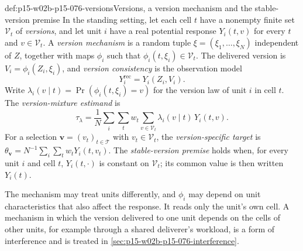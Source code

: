 \begin{hbdefinition}{def:p15-w02b-p15-076-versions}{Versions, a version mechanism and the stable-version premise}
In the standing setting, let each cell \(t\) have a nonempty finite set
\(\mathcal V_t\) of \emph{versions}, and let unit \(i\) have a real
potential response \(Y_i(t,v)\) for every \(t\) and \(v\in\mathcal V_t\).
A \emph{version mechanism} is a random tuple
\(\xi=(\xi_1,\ldots,\xi_N)\) independent of \(Z\), together with maps
\(\phi_i\) such that \(\phi_i(t,\xi_i)\in\mathcal V_t\). The delivered
version is \(V_i=\phi_i(Z_i,\xi_i)\), and \emph{version consistency} is
the observation model
\[
 Y_i^{\mathrm{rec}}=Y_i(Z_i,V_i).
\]
Write \(\lambda_i(v\mid t)=\Pr(\phi_i(t,\xi_i)=v)\) for the version law
of unit \(i\) in cell \(t\). The \emph{version-mixture estimand} is
\[
 \tau_\lambda=\frac1N\sum_i\sum_tw_t\sum_{v\in\mathcal V_t}
   \lambda_i(v\mid t)\,Y_i(t,v).
\]
For a selection \(\mathbf v=(v_t)_{t\in\mathcal T}\) with
\(v_t\in\mathcal V_t\), the \emph{version-specific target} is
\(\theta_{\mathbf v}=N^{-1}\sum_i\sum_tw_tY_i(t,v_t)\).
The \emph{stable-version premise} holds when, for every unit \(i\) and
cell \(t\), \(Y_i(t,\cdot)\) is constant on \(\mathcal V_t\); its common
value is then written \(Y_i(t)\).
\end{hbdefinition}

The mechanism may treat units differently, and \(\phi_i\) may depend on
unit characteristics that also affect the response. It reads only the
unit's own cell. A mechanism in which the version delivered to one unit
depends on the cells of other units, for example through a shared
deliverer's workload, is a form of interference and is treated in
\cref{sec:p15-w02b-p15-076-interference}.

